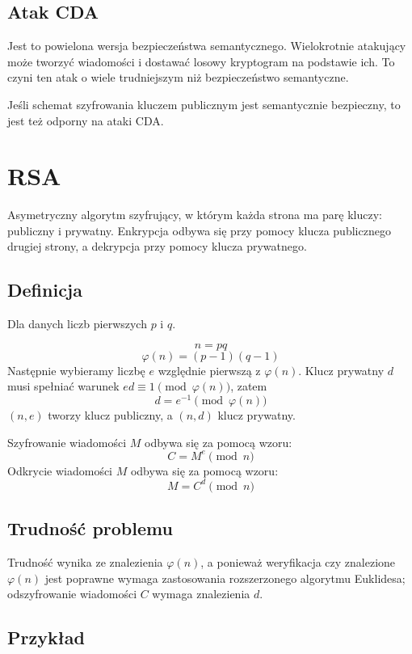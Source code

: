 \documentclass{../notatki}
\begin{document}
\subsection{Atak CDA}

Jest to powielona wersja bezpieczeństwa semantycznego. Wielokrotnie atakujący
może tworzyć wiadomości i dostawać losowy kryptogram na podstawie ich. To czyni
ten atak o wiele trudniejszym niż bezpieczeństwo semantyczne.

Jeśli schemat szyfrowania kluczem publicznym jest semantycznie bezpieczny,
to jest też odporny na ataki CDA.

\section{RSA}

Asymetryczny algorytm szyfrujący, w którym każda strona ma parę
kluczy: publiczny i prywatny. Enkrypcja odbywa się przy pomocy klucza
publicznego drugiej strony, a dekrypcja przy pomocy klucza prywatnego.

\subsection{Definicja}

Dla danych liczb pierwszych $p$ i $q$.

$$
n = pq
$$
$$
\varphi(n) = (p-1)(q-1)
$$
Następnie wybieramy liczbę $e$ względnie pierwszą z $\varphi(n)$.
Klucz prywatny $d$ musi spełniać warunek $ed \equiv 1
\pmod{\varphi(n)}$, zatem
$$
d = e^{-1} \pmod{\varphi(n)}
$$
$(n, e)$ tworzy klucz publiczny, a $(n, d)$ klucz prywatny.

Szyfrowanie wiadomości $M$ odbywa się za pomocą wzoru:
$$
C = M^e \pmod{n}
$$
Odkrycie wiadomości $M$ odbywa się za pomocą wzoru:
$$
M = C^d \pmod{n}
$$

\subsection{Trudność problemu}

Trudność wynika ze znalezienia $\varphi(n)$, a ponieważ weryfikacja
czy znalezione $\varphi(n)$ jest poprawne wymaga zastosowania rozszerzonego
algorytmu Euklidesa; odszyfrowanie wiadomości $C$ wymaga znalezienia $d$.

\subsection{Przykład}
\end{document}
